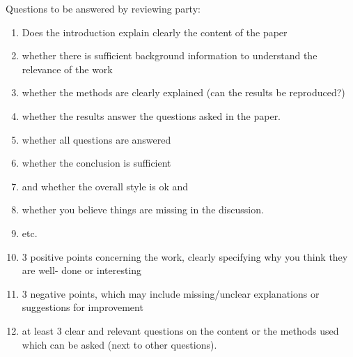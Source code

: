 \documentclass[letterpaper]{article}
\begin{document}
Questions to be answered by reviewing party:
\begin{enumerate}
 \item Does the introduction explain clearly the content of the paper
 \item whether there is sufficient background information to understand the relevance of the work
 \item whether the methods are clearly explained (can the results be reproduced?)
 \item whether the results answer the questions asked in the paper.
 \item whether all questions are answered
 \item whether the conclusion is sufficient
 \item and whether the overall style is ok and
 \item whether you believe things are missing in the discussion.
 \item etc.
 \item 3 positive points concerning the work, clearly specifying why you think they are well-
       done or interesting
 \item 3 negative points, which may include missing/unclear explanations or suggestions for
       improvement
 \item at least 3 clear and relevant questions on the content or the methods used which can be asked (next to other questions).
\end{enumerate}

\footnotesize


\end{document}
